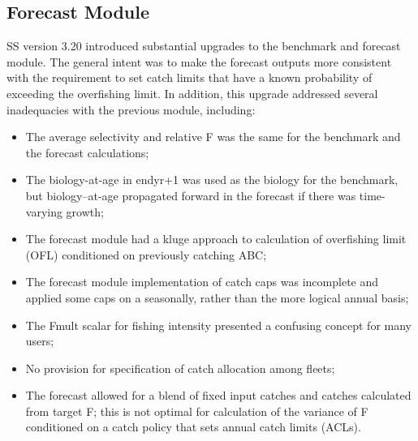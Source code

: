 \hypertarget{appendB}{}
\subsection{Forecast Module}
\label{sec:forecast}

SS version 3.20 introduced substantial upgrades to the benchmark and forecast module.  The general intent was to make the forecast outputs more consistent with the requirement to set catch limits that have a known probability of exceeding the overfishing limit.  In addition, this upgrade addressed several inadequacies with the previous module, including:

\begin{itemize}
	\item The average selectivity and relative F was the same for the benchmark and the forecast calculations;
	\item The biology-at-age in endyr+1 was used as the biology for the benchmark, but biology–at-age propagated forward in the forecast if there was time-varying growth;
	\item The forecast module had a kluge approach to calculation of overfishing limit (OFL) conditioned on previously catching ABC;
	\item The forecast module implementation of catch caps was incomplete and applied some caps on a seasonally, rather than the more logical annual basis;
	\item The Fmult scalar for fishing intensity presented a confusing concept for many users;
	\item No provision for specification of catch allocation among fleets;
	\item The forecast allowed for a blend of fixed input catches and catches calculated from target F; this is not optimal for calculation of the variance of F conditioned on a catch policy that sets annual catch limits (ACLs).
\end{itemize}

